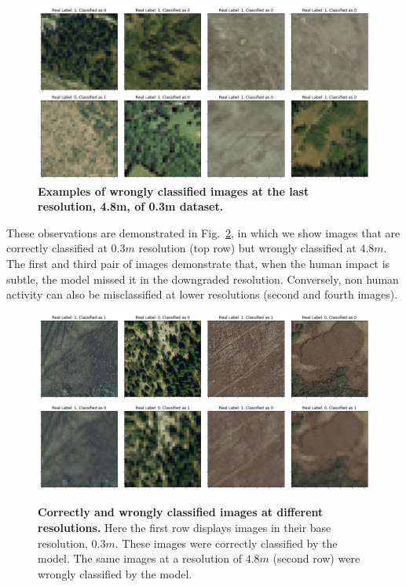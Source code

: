 \begin{figure}[H]
	\centering
	\captionsetup{width=1\linewidth}
	\includegraphics[width=1\textwidth]{Figures/results/class_dataset03m_res48_wrong.png}
	\caption{\textbf{Examples of wrongly classified images at the last resolution, 4.8m, of 0.3m dataset.}}
	\label{fig:dataset03m_res48_wrong}
\end{figure}

These observations are demonstrated in Fig.~\ref{fig:dataset03m_res03_res48_comp}, in which we show images that are correctly classified at $0.3m$ resolution (top row) but wrongly classified at $4.8m$. The first and third pair of images demonstrate that, when the human impact is subtle, the model missed it in the downgraded resolution. Conversely, non human activity can also be misclassified at lower resolutions (second and fourth images).

\begin{figure}[H]
	\centering
	\captionsetup{width=1\linewidth}
	\includegraphics[width=1\textwidth]{Figures/results/class_dataset03m_res03_comp_correct.png}
	\includegraphics[width=1\textwidth]{Figures/results/class_dataset03m_res48_comp_wrong.png}
	\caption{\textbf{Correctly and wrongly classified images at different resolutions.} Here the first row displays images in their base resolution, $0.3m$. These images were correctly classified by the model. The same images at a resolution of $4.8m$ (second row) were wrongly classified by the model.}
	\label{fig:dataset03m_res03_res48_comp}
\end{figure}

